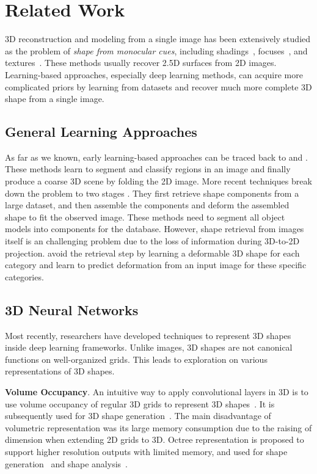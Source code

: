 \section{Related Work}
3D reconstruction and modeling from a single image has been extensively studied as the problem of \emph{shape from monocular cues}, including shadings~\cite{shapefromshadingsurvey}, focuses~\cite{shapefromdf1,shapefromdf2}, and textures~\cite{Aloimonos1988}. 
These methods usually recover 2.5D surfaces from 2D images. 
Learning-based approaches, especially deep learning methods, can acquire more complicated priors by learning from datasets and recover much more complete 3D shape from a single image.
 
\subsection{General Learning Approaches}
As far as we known, early learning-based approaches can be traced back to \cite{Hoiem2007} and \cite{learn3D2007}. These methods learn to segment and classify regions in an image and finally produce a coarse 3D scene by folding the 2D image.
%
More recent techniques break down the problem to two stages \cite{Su:2014,jointimgshape}. They first retrieve shape components from a large dataset, and then assemble the components and deform the assembled shape to fit the observed image. These methods need to segment all object models into components for the database.
%
However, shape retrieval from images itself is an challenging problem due to the loss of information during 3D-to-2D projection. 
\cite{imgrecon15} avoid the retrieval step by learning a deformable 3D shape for each category and learn to predict deformation from an input image for these specific categories.
%
\subsection{3D Neural Networks}
Most recently, researchers have developed techniques to represent 3D shapes inside deep learning frameworks. Unlike images, 3D shapes are not canonical functions on well-organized grids.
This leads to exploration on various representations of 3D shapes.

\noindent\textbf{Volume Occupancy}. 
An intuitive way to apply convolutional layers in 3D is to use volume occupancy of regular 3D grids to represent 3D shapes~\cite{3dshapenet}. It is subsequently used for 3D shape generation~\cite{3DR2N2,learnobj}.
%
The main disadvantage of volumetric representation was its large memory consumption due to the raising of dimension when extending 2D grids to 3D. 
Octree representation is proposed to support higher resolution outputs with limited memory, and used for shape generation~\cite{octreegen} and shape analysis~\cite{ocnn}.

